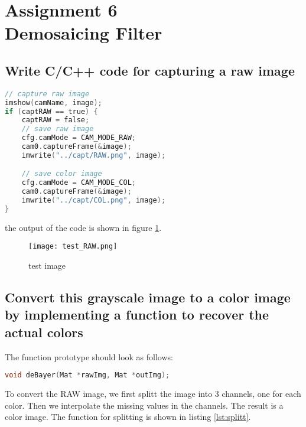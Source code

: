 \section {Assignment 6 \\ {Demosaicing Filter}}
\label {sec:assignment_6}

\subsection{Write C/C++ code for capturing a raw image}

\begin{lstlisting}[language=C, caption=save image to file, label=lst:rawcode]
// capture raw image
imshow(camName, image);
if (captRAW == true) {
    captRAW = false;
    // save raw image
    cfg.camMode = CAM_MODE_RAW;
    cam0.captureFrame(&image);
    imwrite("../capt/RAW.png", image);

    // save color image
    cfg.camMode = CAM_MODE_COL;
    cam0.captureFrame(&image);
    imwrite("../capt/COL.png", image);
}
\end{lstlisting}

the output of the code is shown in figure \ref{fig:input}.

\begin{figure}[ht]
    \centering
    \texttt{[image: test\_RAW.png]}
    \caption{test image}
    \label{fig:input}
    \end{figure}

\subsection{Convert this grayscale image to a color image by implementing a function to recover the actual colors}
The function prototype should look as follows:
\begin{lstlisting}[language=C, caption=function prototype, label=lst:prototype]
void deBayer(Mat *rawImg, Mat *outImg);
\end{lstlisting}


To convert the RAW image, we first splitt the image into 3 channels, one for each color. Then we interpolate the missing values in the channels. The result is a color image. The function for splitting is shown in listing \ref{lst:splitt}.

